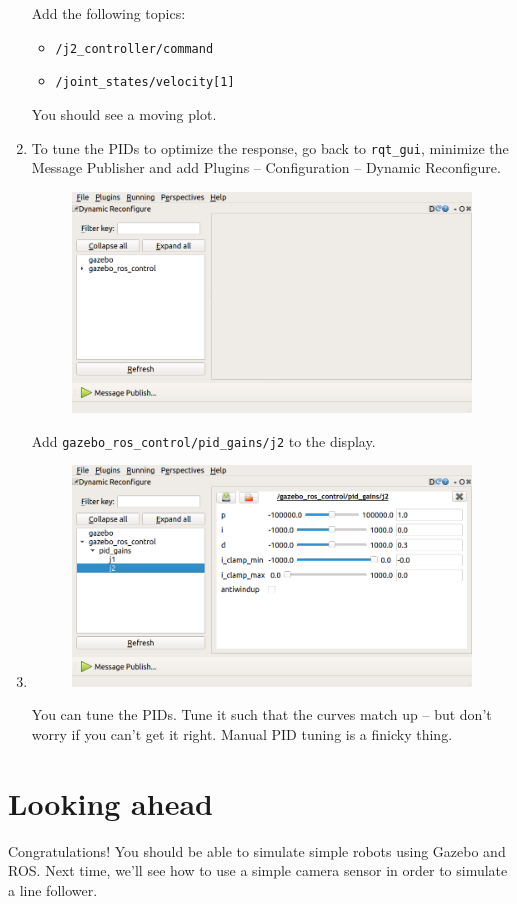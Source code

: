 \documentclass{article}
\begin{document}
\begin{enumerate}
\begin{figure}[H]
            \end{figure}
            Add the following topics:
            \begin{itemize}
                \item \texttt{/j2\_controller/command}
                \item \texttt{/joint\_states/velocity[1]}
            \end{itemize}
            You should see a moving plot. 
            \item To tune the PIDs to optimize the response, go 
            back to \texttt{rqt\_gui}, minimize the Message Publisher and add Plugins -- Configuration -- 
            Dynamic Reconfigure.
            \begin{figure}[H]
                \center
                \includegraphics[width = \textwidth]{image_6.png}
            \end{figure}
            Add \texttt{gazebo\_ros\_control/pid\_gains/j2} to the display.
            \item \begin{figure}[H]
                \center
                \includegraphics[width = \textwidth]{image_7.png}
            \end{figure}
            You can tune the PIDs. Tune it such that the curves match up -- but don't worry
            if you can't get it right. Manual PID tuning is a finicky thing. 
        \end{enumerate}
        \section{Looking ahead}
        Congratulations! You should be able to simulate simple robots using Gazebo and 
        ROS. Next time, we'll see how to use a simple camera sensor in order to simulate a line follower.
\end{document}
